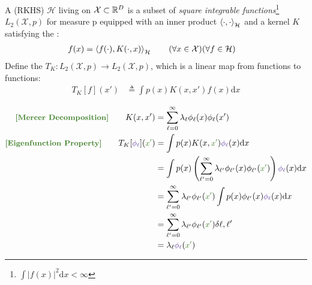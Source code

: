 \documentclass[11pt]{article}
\newcommand\mc{\mathcal}
\begin{document}
\begin{comment}
Recall that the definition of a kernel function $K(x, x')$ is that it must be expressible as $\innerprod{\phi(x)}{\phi(x')}$ for some feature function $\phi: \mc X \to V$ where $V \subseteq \mc X$. Clearly, this is symmetric wrt the arguments $x,x'$. Note that the domain and range of $K$ are both functions $f: \mc X \to \R$ that can be expressed in some orthonormal basis $\{\phi_i \}_{i=1}^M$. Also, since $K$ is symmetric
	\begin{align}
		K \ket{\psi} 
			&= \sum_{j=1}^{M} K \ket{\phi_j}\braket{\phi_j \mid \psi} \\
			&=   \sum_{j = 1}^{M}  \sum_{i=1}^{M} K_{i,j} \ket{\phi_i}\braket{\phi_j \mid \psi} \\
			&=   \sum_{j = 1}^{M}  \sum_{i=1}^{M}  \ket{\phi_i}\bra{\phi_i}K\ket{\phi_j}   \braket{\phi_j \mid \psi} \\
		\implies 
		\bra{\psi} K \ket{\psi}
			&= \sum_{j = 1}^{M}  \sum_{i=1}^{M}  \braket{\psi \mid \phi_i}\bra{\phi_i}K\ket{\phi_j}   \braket{\phi_j \mid \psi} \\
	\end{align}
\end{comment}




A  (RKHS) $\mc H$ living on $\mc X \subset \R^D$ is a subset of \textit{square integrable functions}\footnote{$\int |f(x)|^2 \mathrm{d}x < \infty$}$L_2(\mc X, p)$ for measure p equipped with an inner product $\innerprod{\cdot}{\cdot}_{\mc H}$ and a kernel $K$ satisfying the :
\begin{align}
	f(x) &= 
	\innerprod{f(\cdot)}{K(\cdot, x)}_{\mc H}
	\qquad 	(\forall x \in \mc X) (\forall f \in \mc H) 
\end{align}
Define the  $T_K : L_2(\mc X, p) \to L_2(\mc X, p)$, which is a linear map from functions to functions:
\begin{align}
	T_K[f](x')
	&\triangleq \int p(x) K(x, x') f(x) \mathrm{d}x 
\end{align}

\begin{align}
	\mtgreen{[Mercer Decomposition]}\qquad
	K(x, x') 
	&= \sum_{\ell = 0}^{\infty} \lambda_{\ell} \phi_{\ell}(x) \phi_{\ell}(x') \\
	\mtgreen{[Eigenfunction Property]}\qquad
	T_K[\mpurple{\phi_\ell}](\mgreen{x'})
	&= \int p(x) K(x,\mgreen{x'})\mpurple{\phi_\ell}(x) \mathrm{d} x \\
	&= \int p(x) \lr{ \sum_{\ell' = 0}^{\infty} \lambda_{\ell'} \phi_{\ell'}(x) \phi_{\ell'}(\mgreen{x'}) }\mpurple{\phi_\ell}(x) \mathrm{d} x \\ 
	&=  \sum_{\ell' = 0}^{\infty} \lambda_{\ell'} \phi_{\ell'}(\mgreen{x'})  \int p(x) \phi_{\ell'}(x) \mpurple{\phi_\ell}(x) \mathrm{d} x \\ 
	&= \sum_{\ell' = 0}^{\infty} \lambda_{\ell'} \phi_{\ell'}(\mgreen{x'}) \delta{\ell, \ell'} \\
	&= \lambda_{\ell}  \mpurple{\phi_{\ell}}(\mgreen{x'})
\end{align}
\end{document}
